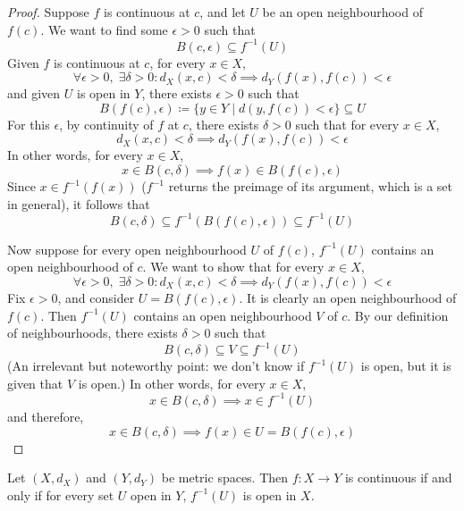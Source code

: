 \begin{proof}
  Suppose $f$ is continuous at $c$, and let $U$ be an open neighbourhood of $f(c)$. We want to find some $\epsilon > 0$ such that
  \[
    B(c, \epsilon) \subseteq f ^ {-1} (U)
  \]
  Given $f$ is continuous at $c$, for every $x \in X$,
  \[
    \forall \epsilon > 0, \; \exists \delta > 0: d_X(x, c) < \delta \implies d_Y(f(x), f(c)) < \epsilon
  \]
  and given $U$ is open in $Y$, there exists $\epsilon > 0$ such that 
  \[
    B(f(c), \epsilon) \coloneqq \{y \in Y \; | \; d(y, f(c)) < \epsilon \} \subseteq U
  \]
  For this $\epsilon$, by continuity of $f$ at $c$, there exists $\delta > 0$ such that for every $x \in X$,
  \[
    d_X(x, c) < \delta \implies d_Y(f(x), f(c)) < \epsilon
  \]
  In other words, for every $x \in X$,
  \[
    x \in B(c, \delta) \implies f(x) \in B(f(c), \epsilon)
  \]
  Since $x \in f ^ {-1} (f(x))$ ($f ^ {-1}$ returns the preimage of its argument, which is a set in general), it follows that
  \[
    B(c, \delta) \subseteq f ^ {-1} (B(f(c), \epsilon)) \subseteq f ^ {-1} (U)
  \]

  Now suppose for every open neighbourhood $U$ of $f(c)$, $f ^ {-1} (U)$ contains an open neighbourhood of $c$. We want to show that for every $x \in X$,
  \[
    \forall \epsilon > 0, \; \exists \delta > 0: d_X(x, c) < \delta \implies d_Y(f(x), f(c)) < \epsilon
  \]
  Fix $\epsilon > 0$, and consider $U = B(f(c), \epsilon)$. It is clearly an open neighbourhood of $f(c)$. Then $f ^ {-1} (U)$ contains an open neighbourhood $V$ of $c$. By our definition of neighbourhoods, there exists $\delta > 0$ such that
  \[
    B(c, \delta) \subseteq V \subseteq f ^ {-1} (U)
  \]
  (An irrelevant but noteworthy point: we don't know if $f ^ {-1} (U)$ is open, but it is given that $V$ is open.) In other words, for every $x \in X$,
  \[
    x \in B(c, \delta) \implies x \in f ^ {-1} (U)
  \]
  and therefore,
  \[
    x \in B(c, \delta) \implies f(x) \in U = B(f(c), \epsilon)
  \]
\end{proof}
\begin{prop}[PSET 2, Q7]
  Let $(X, d_X)$ and $(Y, d_Y)$ be metric spaces. Then $f: X \to Y$ is continuous if and only if for every set $U$ open in $Y$, $f ^ {-1} (U)$ is open in $X$.
\end{prop}
